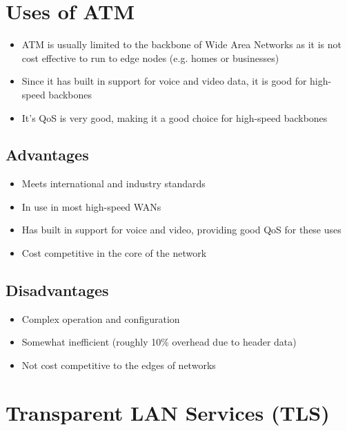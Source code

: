 \section*{Uses of ATM}

\begin{itemize}
  \item ATM is usually limited to the backbone of Wide Area Networks as it is not cost effective to run to edge nodes (e.g. homes or businesses)
  \item Since it has built in support for voice and video data, it is good for high-speed backbones
  \item It's QoS is very good, making it a good choice for high-speed backbones
\end{itemize}

\subsection*{Advantages}

\begin{itemize}
  \item Meets international and industry standards
  \item In use in most high-speed WANs
  \item Has built in support for voice and video, providing good QoS for these uses
  \item Cost competitive in the core of the network
\end{itemize}

\subsection*{Disadvantages}

\begin{itemize}
  \item Complex operation and configuration
  \item Somewhat inefficient (roughly 10\% overhead due to header data)
  \item Not cost competitive to the edges of networks
\end{itemize}

\section*{Transparent LAN Services (TLS)}

